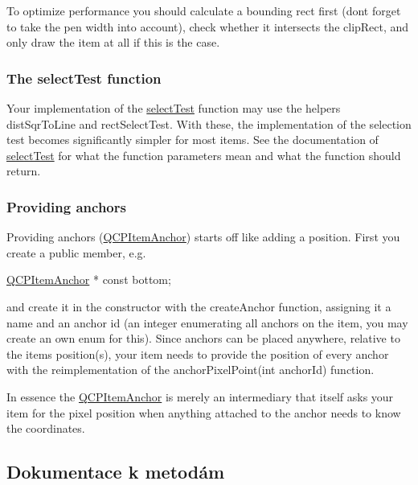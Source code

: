 To optimize performance you should calculate a bounding rect first (don\textquotesingle{}t forget to take the pen width into account), check whether it intersects the clip\+Rect, and only draw the item at all if this is the case.\hypertarget{classQCPAbstractItem_items-selection}{}\subsubsection{The select\+Test function}\label{classQCPAbstractItem_items-selection}
Your implementation of the \hyperlink{classQCPAbstractItem_aa7055ea577888915c52170eb8b8d1bc6}{select\+Test} function may use the helpers dist\+Sqr\+To\+Line and rect\+Select\+Test. With these, the implementation of the selection test becomes significantly simpler for most items. See the documentation of \hyperlink{classQCPAbstractItem_aa7055ea577888915c52170eb8b8d1bc6}{select\+Test} for what the function parameters mean and what the function should return.\hypertarget{classQCPAbstractItem_anchors}{}\subsubsection{Providing anchors}\label{classQCPAbstractItem_anchors}
Providing anchors (\hyperlink{classQCPItemAnchor}{Q\+C\+P\+Item\+Anchor}) starts off like adding a position. First you create a public member, e.\+g.


\begin{DoxyCode}
\hyperlink{classQCPItemAnchor}{QCPItemAnchor} * \textcolor{keyword}{const} bottom;
\end{DoxyCode}


and create it in the constructor with the create\+Anchor function, assigning it a name and an anchor id (an integer enumerating all anchors on the item, you may create an own enum for this). Since anchors can be placed anywhere, relative to the item\textquotesingle{}s position(s), your item needs to provide the position of every anchor with the reimplementation of the anchor\+Pixel\+Point(int anchor\+Id) function.

In essence the \hyperlink{classQCPItemAnchor}{Q\+C\+P\+Item\+Anchor} is merely an intermediary that itself asks your item for the pixel position when anything attached to the anchor needs to know the coordinates. 

\subsection{Dokumentace k metodám}
\hypertarget{classQCPAbstractItem_abed974cba7cc02608c71dad4638e008d}{}
